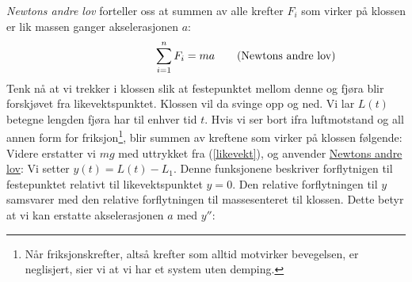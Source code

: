 \textit{Newtons andre lov} forteller oss at summen av alle krefter $ F_i $ som virker på klossen er lik massen ganger akselerasjonen $ a $:
\[\phantom{testingcloservlo} \sum\limits_{i=1}^n F_i = ma \tag{Newtons andre lov\label{newt2lov}}\]
Tenk nå at vi trekker i klossen slik at festepunktet mellom denne og fjøra blir forskjøvet fra likevektspunktet. Klossen vil da svinge opp og ned. Vi lar $ L(t) $ betegne lengden fjøra har til enhver tid $ t $. Hvis vi ser bort ifra luftmotstand og all annen form for friksjon\footnote{Når friksjonskrefter, altså krefter som alltid motvirker bevegelsen, er neglisjert, sier vi at vi har et system uten demping.}, blir summen av kreftene som virker på klossen følgende:
Videre erstatter vi $ mg $ med uttrykket fra (\ref{likevekt}), og anvender \hyperref[newt2lov]{Newtons andre lov}:
Vi setter  ${y(t)=L(t)-L_1}$. Denne funksjonene beskriver forflytnigen til festepunktet relativt til likevektspunktet $ {y=0} $. Den relative forflytningen til $ y $ samsvarer med den relative forflytningen til massesenteret til klossen. Dette betyr at vi kan erstatte akselerasjonen $ a $ med $ y'' $:
